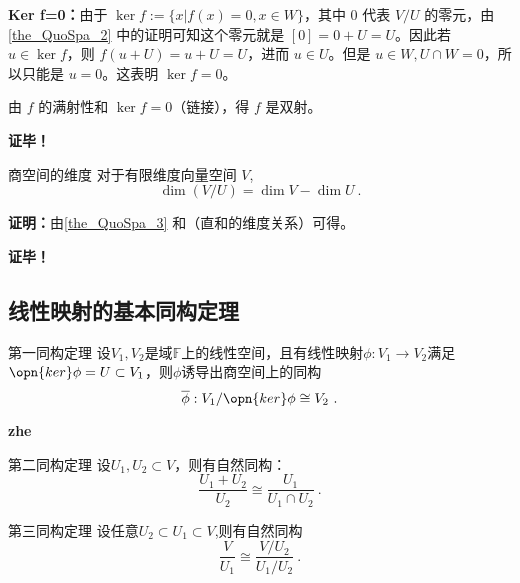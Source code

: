 \textbf{Ker f=0：}由于 $\ker f:=\{x|f(x)=0,x\in W\}$，其中 $0$ 代表 $V/U$ 的零元，由\autoref{the_QuoSpa_2} 中的证明可知这个零元就是 $[0]=0+U=U$。因此若 $u\in\ker f$，则 $f(u+U)=u+U=U$，进而 $u\in U$。但是 $u\in W,U\cap W=0$，所以只能是 $u=0$。这表明 $\ker f=0$。

由 $f$ 的满射性和 $\ker f=0$（链接），得 $f$ 是双射。

\textbf{证毕！}

\begin{corollary}{商空间的维度}
对于有限维度向量空间 $V$,
\begin{equation}\label{eq_QuoSpa_2}
\dim(V/U) = \dim V - \dim U~.
\end{equation}
\end{corollary}

\textbf{证明：}由\autoref{the_QuoSpa_3} 和（直和的维度关系）可得。

\textbf{证毕！}
\subsection{线性映射的基本同构定理}
\begin{theorem}{第一同构定理}
设$V_1,V_2$是域$\mathbb F$上的线性空间，且有线性映射$\phi:V_1\rightarrow V_2$满足$\opn{ker}\phi=U\subset V_1$，则$\phi$诱导出商空间上的同构
\begin{equation}
\overline \phi:V_1/\opn{ker}\phi\cong  V_2~.
\end{equation}

\textbf{zhe}
\end{theorem}
\begin{theorem}{第二同构定理}
设$U_1,U_2\subset V$，则有自然同构：
\begin{equation}
\frac{U_1+U_2}{U_2}\cong \frac{U_1}{U_1\cap U_2}~.
\end{equation}

\end{theorem}
\begin{theorem}{第三同构定理}
设任意$U_2\subset U_1\subset V$,则有自然同构
\begin{equation}
\frac{V}{U_1}\cong \frac{V/U_2}{U_1/U_2}~.
\end{equation}

\end{theorem}
\begin{corollary}{}

\end{corollary}






